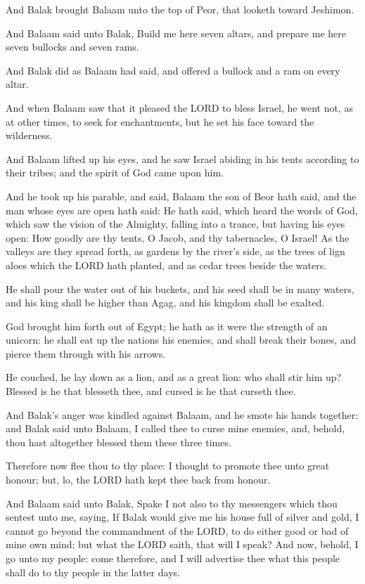 \Verse And Balak brought Balaam unto the top of Peor, that looketh
toward Jeshimon.

\Verse And Balaam said unto Balak, Build me here seven altars, and
prepare me here seven bullocks and seven rams.

\Verse And Balak did as Balaam had said, and offered a bullock and a
ram on every altar.


\Chapter
\Verse And when Balaam saw that it pleased the LORD to bless Israel, he
went not, as at other times, to seek for enchantments, but he set his
face toward the wilderness.

\Verse And Balaam lifted up his eyes, and he saw Israel abiding in his
tents according to their tribes; and the spirit of God came upon him.

\Verse And he took up his parable, and said, Balaam the son of Beor hath
said, and the man whose eyes are open hath said: \Verse He hath said,
which heard the words of God, which saw the vision of the Almighty,
falling into a trance, but having his eyes open: \Verse How goodly are
thy tents, O Jacob, and thy tabernacles, O Israel!  \Verse As the
valleys are they spread forth, as gardens by the river's side, as the
trees of lign aloes which the LORD hath planted, and as cedar trees
beside the waters.

\Verse He shall pour the water out of his buckets, and his seed shall be
in many waters, and his king shall be higher than Agag, and his
kingdom shall be exalted.

\Verse God brought him forth out of Egypt; he hath as it were the
strength of an unicorn: he shall eat up the nations his enemies, and
shall break their bones, and pierce them through with his arrows.

\Verse He couched, he lay down as a lion, and as a great lion: who shall
stir him up? Blessed is he that blesseth thee, and cursed is he that
curseth thee.

\Verse And Balak's anger was kindled against Balaam, and he smote his
hands together: and Balak said unto Balaam, I called thee to curse
mine enemies, and, behold, thou hast altogether blessed them these
three times.

\Verse Therefore now flee thou to thy place: I thought to promote thee
unto great honour; but, lo, the LORD hath kept thee back from honour.

\Verse And Balaam said unto Balak, Spake I not also to thy messengers
which thou sentest unto me, saying, \Verse If Balak would give me his
house full of silver and gold, I cannot go beyond the commandment of
the LORD, to do either good or bad of mine own mind; but what the LORD
saith, that will I speak?  \Verse And now, behold, I go unto my people:
come therefore, and I will advertise thee what this people shall do to
thy people in the latter days.


